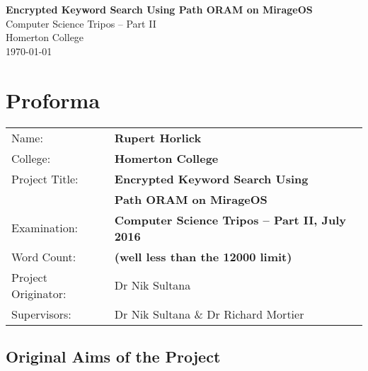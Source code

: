 \documentclass[12pt,a4paper,twoside,openright]{report}
\begin{document}




\pagestyle{empty}


\vspace*{60mm}
\begin{center}
\Huge
\textbf{Encrypted Keyword Search Using Path ORAM on MirageOS} \\[5mm]
Computer Science Tripos -- Part II \\[5mm]
Homerton College \\[5mm]
\today  %
\end{center}


\pagestyle{plain}

\chapter*{Proforma}

{\large
\begin{tabular}{ll}
Name:               & \bf Rupert Horlick                       \\
College:            & \bf Homerton College                     \\
Project Title:      & \bf Encrypted Keyword Search Using \\
& \bf Path ORAM on MirageOS \\
Examination:        & \bf Computer Science Tripos -- Part II, July 2016  \\
Word Count:         & \bf \footnotemark[1]
                      (well less than the 12000 limit)  \\
Project Originator: & Dr Nik Sultana                    \\
Supervisors:         & Dr Nik Sultana \& Dr Richard Mortier                    \\ 
\end{tabular}
}


\section*{Original Aims of the Project}
\end{document}
